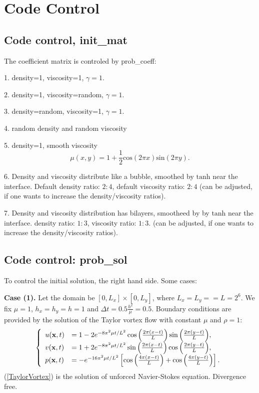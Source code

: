 \documentclass[final]{siamltex}
\begin{document}
\section{Code Control}

\subsection{Code control, init\_mat} The coefficient matrix is controled by 
prob\_coeff:
 
1. density=1, viscosity=1, $\gamma=1$.

2. density=1, viscosity=random, $\gamma=1$.

3. density=random, viscosity=1, $\gamma=1$.

4. random density and random viscosity

5. density=1, smooth viscosity
$$
\mu(x,y)=1+\frac{1}{2} \mbox{cos}(2 \pi x) \mbox{sin}(2 \pi y).
$$

6. Density and viscosity distribute like a bubble, smoothed by $\mbox{tanh}$ near the interface. Default density ratio: $2:4$, default 
viscosity ratio: $2:4$ (can be adjusted, if one wants to increase the density/viscosity ratios).   

7. Density and viscosity distribution has bilayers, smootheed by by $\mbox{tanh}$ near the interface. density ratio: $1:3$, viscosity ratio: $1:3$.  (can be adjusted, if one wants to increase the density/viscosity ratios). 

\subsection{Code control: prob\_sol} To control the initial solution, the right hand side. Some cases: 

{\bf Case (1).} Let the domain be $[0, L_x] \times [0, L_y]$, where $L_x=L_y==L=2^{6}$. We fix $\mu =1$, $h_x=h_y=h=1$ and $\Delta t= 0.5 \frac{h^2}{\mu }= 0.5$. 
Boundary conditions are provided by the solution of the Taylor vortex flow with constant
$\mu$ and $\rho=1$:
\begin{equation}\label{TaylorVortex}
 \left \{
  \begin{array} {lll}
u({\bf x}, t)&=1 - 2e^{-8\pi^2\mu t/L^2}\cos{\left(\frac{2\pi(x-t)}{L}\right)}\sin{\left(\frac{2\pi(y-t)}{L}\right)},  \\
v({\bf x}, t)&=1 + 2e^{-8\pi^2\mu t/L^2}\sin{\left(\frac{2\pi(x-t)}{L}\right)}\cos{\left(\frac{2\pi(y-t)}{L}\right)}, \\
p({\bf x}, t)&= -e^{-16\pi^2\mu t/L^2}\left[\cos{\left(\frac{4\pi(x-t)}{L}\right)} + \cos{\left(\frac{4\pi(y-t)}{L}\right)}\right].
  \end{array}
 \right.
\end{equation}
(\ref{TaylorVortex}) is the solution of unforced Navier-Stokes equation.
Divergence free. 
\end{document}
